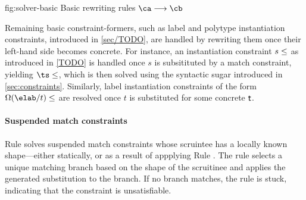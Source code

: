 \documentclass[acmsmall,screen,nonacm,review]{acmart}
\begin{document}
\begin{mathparfig}[t]
  {fig:solver-basic}
  {Basic rewriting rules $\ca \csolve \cb$}
  \rewrite[S-Unif]
    {\upa \\ \upa \unif \upb}
    {\upb}

  \rewrite[S-Let]
    {\clet \x \tv \ca \cb}
    {\cletr \x \tv \eset \ca \cb}

    {\cexists \tv {\ca \cand \cb}}

    {\cletr \x \tv {\tvs, \tvb} \ca \cb}

    {\cexists \tvb {\clet \x \tvs \ca \cb}}

    {\ca \cand \cletr \x \tv \tvs \cb \cc}

    {\cc \cand \Clet \x \tv \ca \cb}
\end{mathparfig}


Remaining basic constraint-formers, such as label and polytype instantiation
constraints, introduced in \cref{sec/TODO}, are handled by rewriting them once
their left-hand side becomes concrete. For instance, an instantiation
constraint $s \leq \relax$ as introduced in \cref{TODO} is handled once $s$ is subsitituted by a match constraint,
yielding $\ts \leq \t$, which is then solved using the syntactic sugar
introduced in \cref{sec:constraints}. Similarly, label instantiation
constraints of the form $\Omega(\elab/t) \leq \t$ are resolved once $t$ is
substituted for some concrete $\mathrel{\mathsf{t}}\mathclose{}$.

\paragraph{Suspended match constraints}


Rule  solves suspended match constraints whose scruintee
has a locally known shape---either statically, or as a result of appplying
Rule . The rule selects a unique matching branch based on
the shape of the scruitinee and applies the generated substitution to the
branch. If no branch matches, the rule is stuck, indicating that the
constraint is unsatisfiable.
\end{document}
